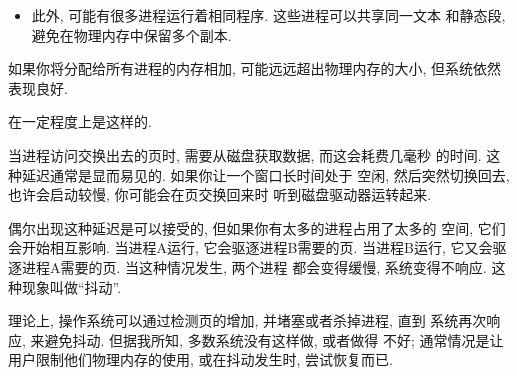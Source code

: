 \documentclass[12pt]{book}
\begin{document}
{\begin{itemize}
\item 此外, 可能有很多进程运行着相同程序. 这些进程可以共享同一文本
和静态段, 避免在物理内存中保留多个副本.

\end{itemize}

如果你将分配给所有进程的内存相加, 可能远远超出物理内存的大小, 
但系统依然表现良好.

在一定程度上是这样的.

当进程访问交换出去的页时, 需要从磁盘获取数据, 而这会耗费几毫秒
的时间. 这种延迟通常是显而易见的. 如果你让一个窗口长时间处于
空闲, 然后突然切换回去, 也许会启动较慢, 你可能会在页交换回来时
听到磁盘驱动器运转起来.

偶尔出现这种延迟是可以接受的, 但如果你有太多的进程占用了太多的
空间, 它们会开始相互影响. 当进程A运行, 它会驱逐进程B需要的页. 
当进程B运行, 它又会驱逐进程A需要的页. 当这种情况发生, 两个进程
都会变得缓慢, 系统变得不响应. 这种现象叫做``抖动''.

理论上, 操作系统可以通过检测页的增加, 并堵塞或者杀掉进程, 直到
系统再次响应, 来避免抖动. 但据我所知, 多数系统没有这样做, 或者做得
不好; 通常情况是让用户限制他们物理内存的使用, 或在抖动发生时, 尝试恢复而已.

}
\end{document}

